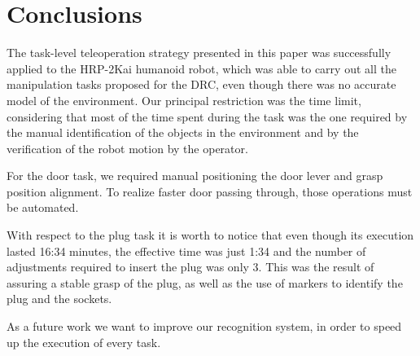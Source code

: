 \section{Conclusions}
	\label{sec:conclusions}
	
	The task-level teleoperation strategy presented in this paper was successfully applied
	to the HRP-2Kai humanoid robot, which was able to carry out all the manipulation tasks
	proposed for the DRC, even though there was no accurate model of the environment.
	Our principal restriction was the time limit, considering that most of the time spent
	during the task was the one required by the manual identification of the objects in the
	environment and by the verification of the robot motion by the operator.

	For the door task, we required manual positioning the door lever and grasp position alignment.
	To realize faster door passing through, those operations must be automated.

	With respect to the plug task it is worth to notice that even though its execution
	lasted 16:34 minutes, the effective time was just 1:34 and the number of adjustments
	required to insert the plug was only 3.
	This was the result of assuring a stable grasp of the plug, as well as the use of markers
	to identify the plug and the sockets.
	
	As a future work we want to improve our recognition system, in order to speed up the execution
	of every task.